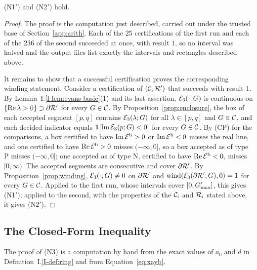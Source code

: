 \begin{proposition}
\label{prop:runs}
\textup{(N1$'$)} and \textup{(N2$'$)} hold.
\end{proposition}
\begin{proof}
The proof is the computation just described, carried out under the trusted base of
Section~\ref{app:arith}. Each of the $25$ certifications of the first run and each
of the $236$ of the second succeeded at once, with result $1$, so no interval was
halved and the output files list exactly the intervals and rectangles described
above.

It remains to show that a successful certification proves the corresponding
winding statement. Consider a certification of $(\mathcal{C},\mathcal{R}')$ that succeeds with result $1$. By
Lemma~I.\ref{I-lem:evans-basic}\textup{(1)} and its last assertion, $\mathcal{E}_3(\cdot;G)$ is continuous on
$\{\Re\lambda>0\}\supset\partial\mathcal{R}'$ for every $G\in\mathcal{C}$. By
Proposition~\ref{prop:enclosure}, the box of each accepted segment $[p,q]$
contains $\mathcal{E}_3(\lambda;G)$ for all $\lambda\in[p,q]$ and $G\in\mathcal{C}$, and each decided
indicator equals $\mathbf 1[\Im\mathcal{E}_3(p;G)<0]$ for every $G\in\mathcal{C}$. By (CP) for
the comparisons, a box certified to have $\Im\mathcal{E}^{\rm b}>0$ or
$\Im\mathcal{E}^{\rm b}<0$ misses the real line, and one certified to have
$\Re\mathcal{E}^{\rm b}>0$ misses $(-\infty,0]$, so a box accepted as of type P misses
$(-\infty,0]$; one accepted as of type N, certified to have $\Re\mathcal{E}^{\rm b}<0$,
misses $[0,\infty)$. The accepted segments are consecutive and cover
$\partial\mathcal{R}'$. By Proposition~\ref{prop:winding}, $\mathcal{E}_3(\cdot;G)\ne0$ on
$\partial\mathcal{R}'$ and $\operatorname{wind}(\mathcal{E}_3(\partial\mathcal{R}';G),0)=1$ for every $G\in\mathcal{C}$.
Applied to the first run, whose intervals cover $[0,G_{\max}']$, this gives
\textup{(N1$'$)}; applied to the second, with the properties of the $\mathcal{C}_i$ and
$\mathcal{R}_i$ stated above, it gives \textup{(N2$'$)}.
\end{proof}

\subsection{The Closed-Form Inequality}

The proof of \textup{(N3)} is a computation by hand from the exact values of
$a_0$ and $d$ in Definition~I.\ref{I-def:ring} and from
Equation~\eqref{eq:xayb}.

